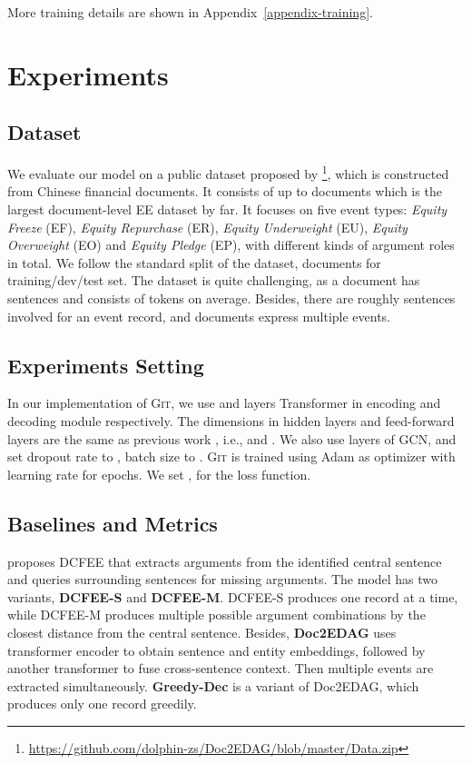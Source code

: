 \documentclass[11pt,a4paper]{article}
\newcommand{\modelname}{\textsc{Git}\xspace}
\begin{document}
More training details are shown in Appendix~\ref{appendix-training}. \section{Experiments}

\subsection{Dataset}
We evaluate our model on a public dataset proposed by \citet{zheng-etal-2019-doc2edag}\footnote{\url{https://github.com/dolphin-zs/Doc2EDAG/blob/master/Data.zip}}, which is constructed from Chinese financial documents.
It consists of up to  documents which is the largest document-level EE dataset by far.
It focuses on five event types: \textit{Equity Freeze} (EF), \textit{Equity Repurchase} (ER), \textit{Equity Underweight} (EU), \textit{Equity Overweight} (EO) and \textit{Equity Pledge} (EP), with  different kinds of argument roles in total.
We follow the standard split of the dataset,  documents for training/dev/test set. 
The dataset is quite challenging, as a document has  sentences and consists of  tokens on average.
Besides, there are roughly  sentences involved for an event record, and  documents express multiple events.


\subsection{Experiments Setting}
In our implementation of \modelname, we use  and  layers Transformer \citep{NIPS2017_7181} in encoding and decoding module respectively. 
The dimensions in hidden layers and feed-forward layers are the same as previous work \citep{zheng-etal-2019-doc2edag}, i.e.,   and .
We also use  layers of GCN, and set dropout rate to , batch size to .
\modelname is trained using Adam \citep{DBLP:journals/corr/KingmaB14} as optimizer with  learning rate for  epochs.
We set ,  for the loss function.

\subsection{Baselines and Metrics}
\citet{yang-etal-2018-dcfee} proposes DCFEE that extracts arguments from the identified central sentence and queries surrounding sentences for missing arguments.
The model has two variants, \textbf{DCFEE-S} and \textbf{DCFEE-M}. DCFEE-S produces one record at a time, while DCFEE-M produces multiple possible argument combinations by the closest distance from the central sentence.
Besides, \textbf{Doc2EDAG} \citep{zheng-etal-2019-doc2edag} uses transformer encoder to obtain sentence and entity embeddings, followed by another transformer to fuse cross-sentence context.
Then multiple events are extracted simultaneously.
\textbf{Greedy-Dec} is a variant of Doc2EDAG, which produces only one record greedily.
\end{document}
